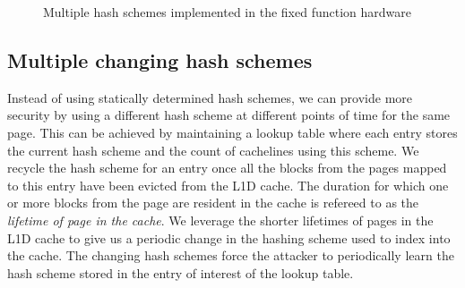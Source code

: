 \begin{figure}
  \caption{Multiple hash schemes implemented in the fixed function hardware}
  \label{figure:multiple_schemes}
\end{figure}

\subsection{Multiple changing hash schemes}
Instead of using statically determined hash schemes, we can provide more security by using a different hash scheme at different points of time for the same page. This can be achieved by maintaining a lookup table where each entry stores the current hash scheme and the count of cachelines using this scheme. We recycle the hash scheme for an entry once all the blocks from the pages mapped to this entry have been evicted from the L1D cache. The duration for which one or more blocks from the page are resident in the cache is refereed to as the \textit{lifetime of page in the cache}. We leverage the shorter lifetimes of pages in the L1D cache to give us a periodic change in the hashing scheme used to index into the cache. The changing hash schemes force the attacker to periodically learn the hash scheme stored in the entry of interest of the lookup table.

